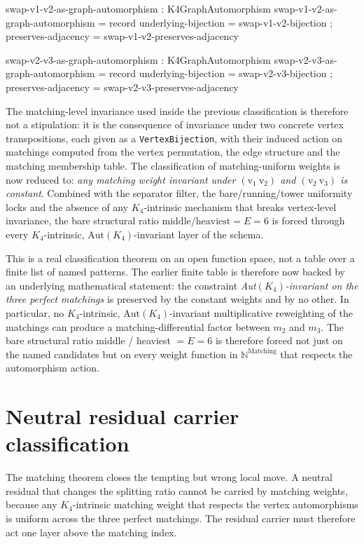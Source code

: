 \documentclass[11pt]{article}
\begin{document}
\begin{code}
swap-v1-v2-as-graph-automorphism : K4GraphAutomorphism
swap-v1-v2-as-graph-automorphism = record
  { underlying-bijection = swap-v1-v2-bijection
  ; preserves-adjacency  = swap-v1-v2-preserves-adjacency
  }

swap-v2-v3-as-graph-automorphism : K4GraphAutomorphism
swap-v2-v3-as-graph-automorphism = record
  { underlying-bijection = swap-v2-v3-bijection
  ; preserves-adjacency  = swap-v2-v3-preserves-adjacency
  }
\end{code}

The matching-level invariance used inside the previous classification
is therefore not a stipulation: it is the consequence of invariance
under two concrete vertex transpositions, each given as a
\texttt{VertexBijection}, with their induced action on matchings
computed from the vertex permutation, the edge structure and the
matching membership table.  The classification of matching-uniform
weights is now reduced to: \emph{any matching weight invariant under
$(\mathrm{v_1}\ \mathrm{v_2})$ and $(\mathrm{v_2}\ \mathrm{v_3})$ is
constant}.  Combined with the separator filter, the bare/running/tower
uniformity locks and the absence of any $K_4$-intrinsic mechanism
that breaks vertex-level invariance, the bare structural ratio
$\text{middle}/\text{heaviest} = E = 6$ is forced through every
$K_4$-intrinsic, $\mathrm{Aut}(K_4)$-invariant layer of the schema.

This is a real classification theorem on an open function space, not
a table over a finite list of named patterns.  The earlier finite
table is therefore now backed by an underlying mathematical statement:
the constraint \emph{Aut$(K_4)$-invariant on the three perfect
matchings} is preserved by the constant weights and by no other.  In
particular, no $K_4$-intrinsic, $\mathrm{Aut}(K_4)$-invariant
multiplicative reweighting of the matchings can produce a
matching-differential factor between $m_2$ and $m_3$.  The bare
structural ratio middle / heaviest $= E = 6$ is therefore forced not
just on the named candidates but on every weight function in
$\mathbb{N}^{\mathrm{Matching}}$ that respects the automorphism
action.

\section{Neutral residual carrier classification}

The matching theorem closes the tempting but wrong local move.  A
neutral residual that changes the splitting ratio cannot be carried by
matching weights, because any $K_4$-intrinsic matching weight that
respects the vertex automorphisms is uniform across the three perfect
matchings.  The residual carrier must therefore act one layer above the
matching index.
\end{document}
